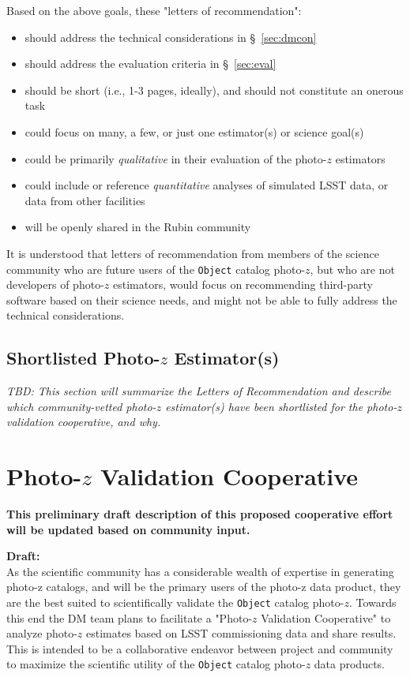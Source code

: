 \documentclass[DM,lsstdraft,toc]{lsstdoc}
\begin{document}
Based on the above goals, these "letters of recommendation":
\begin{itemize}
\item should address the technical considerations in \S~\ref{sec:dmcon}
\item should address the evaluation criteria in  \S~\ref{sec:eval}
\item should be short (i.e., 1-3 pages, ideally), and should not constitute an onerous task
\item could focus on many, a few, or just one estimator(s) or science goal(s)
\item could be primarily {\it qualitative} in their evaluation of the photo-$z$ estimators
\item could include or reference {\it quantitative} analyses of simulated LSST data, or data from other facilities
\item will be openly shared in the Rubin community
\end{itemize}

It is understood that letters of recommendation from members of the science community who are future users of the {\tt Object} catalog photo-$z$, but who are not developers of photo-$z$ estimators, would focus on recommending third-party software based on their science needs, and might not be able to fully address the technical considerations.

\subsection{Shortlisted Photo-$z$ Estimator(s)} \label{ssec:lor_choice}

\textit{TBD: This section will summarize the Letters of Recommendation and describe which community-vetted photo-$z$ estimator(s) have been shortlisted for the photo-$z$ validation cooperative, and why.}

\section{Photo-$z$ Validation Cooperative}\label{sec:pzcoop}

\textbf{This preliminary draft description of this proposed cooperative effort will be updated based on community input.}

\textbf{Draft:} \\
As the scientific community has a considerable wealth of expertise in generating photo-z catalogs, and will be the primary users of the photo-z data product, they are the best suited to scientifically validate the {\tt Object} catalog photo-$z$.
Towards this end the DM team plans to facilitate a "Photo-$z$ Validation Cooperative" to analyze photo-$z$ estimates based on LSST commissioning data and share results.
This is intended to be a collaborative endeavor between project and community to maximize the scientific utility of the {\tt Object} catalog photo-$z$ data products.
\end{document}
